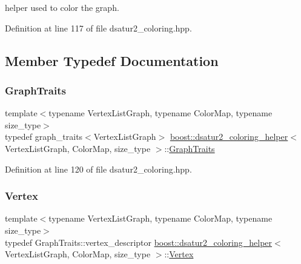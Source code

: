 helper used to color the graph. 

Definition at line 117 of file dsatur2\+\_\+coloring.\+hpp.



\subsection{Member Typedef Documentation}
\mbox{\label{classboost_1_1dsatur2__coloring__helper_a9a3e34ad1277d60091a43044bb0b76d9}} 
\subsubsection{\texorpdfstring{Graph\+Traits}{GraphTraits}}
{\footnotesize\ttfamily template$<$typename Vertex\+List\+Graph, typename Color\+Map, typename size\+\_\+type$>$ \\
typedef graph\+\_\+traits$<$Vertex\+List\+Graph$>$ \hyperlink{classboost_1_1dsatur2__coloring__helper}{boost\+::dsatur2\+\_\+coloring\+\_\+helper}$<$ Vertex\+List\+Graph, Color\+Map, size\+\_\+type $>$\+::\hyperlink{classboost_1_1dsatur2__coloring__helper_a9a3e34ad1277d60091a43044bb0b76d9}{Graph\+Traits}\hspace{0.3cm}{\ttfamily [private]}}



Definition at line 120 of file dsatur2\+\_\+coloring.\+hpp.

\mbox{\label{classboost_1_1dsatur2__coloring__helper_a74e7b43aba95a31b3b06b092482429cb}} 
\subsubsection{\texorpdfstring{Vertex}{Vertex}}
{\footnotesize\ttfamily template$<$typename Vertex\+List\+Graph, typename Color\+Map, typename size\+\_\+type$>$ \\
typedef Graph\+Traits\+::vertex\+\_\+descriptor \hyperlink{classboost_1_1dsatur2__coloring__helper}{boost\+::dsatur2\+\_\+coloring\+\_\+helper}$<$ Vertex\+List\+Graph, Color\+Map, size\+\_\+type $>$\+::\hyperlink{classboost_1_1dsatur2__coloring__helper_a74e7b43aba95a31b3b06b092482429cb}{Vertex}\hspace{0.3cm}{\ttfamily [private]}}



